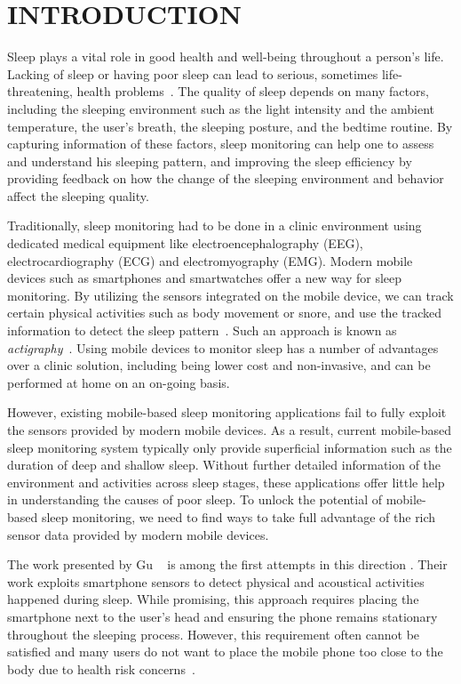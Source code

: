 \section{INTRODUCTION}\label{sec:1introduction}

Sleep plays a vital role in good health and well-being throughout a person's life. Lacking of sleep or having poor sleep can lead to
serious, sometimes life-threatening, health problems~\cite{lallukka2016contribution}. The quality of sleep depends on many factors,
including the sleeping environment such as the light intensity and the ambient temperature, the user's breath, the sleeping posture, and
the bedtime routine. By capturing information of these factors, sleep monitoring can help one to assess and understand his sleeping
pattern, and improving the sleep efficiency by providing feedback on how the change of the sleeping environment and behavior affect the
sleeping quality.

Traditionally, sleep monitoring had to be done in a clinic environment using dedicated medical equipment like electroencephalography (EEG),
electrocardiography (ECG) and electromyography (EMG).  Modern mobile devices such as smartphones and smartwatches offer a new way for sleep
monitoring. By utilizing the sensors integrated on the mobile device, we can track certain physical activities such as body movement or
snore, and use the tracked information to detect the sleep pattern~\cite{zeo,Jawbone,SleepAndroid,fitbit,gu2016sleep}. Such an approach is
known as \emph{actigraphy}~\cite{Actigraphy,ancoli2003role}. Using mobile devices to monitor sleep has a number of advantages over a clinic
solution, including being lower cost and non-invasive, and can be performed at home on an on-going basis.


However, existing mobile-based sleep monitoring applications fail to fully exploit the sensors provided by modern mobile devices. As a
result, current mobile-based sleep monitoring system typically only provide superficial information such as the duration of deep and
shallow sleep. Without further detailed information of the environment and activities across sleep stages, these applications offer little
help in understanding the causes of poor sleep. To unlock the potential of mobile-based sleep monitoring, we need to find ways to take full
advantage of the rich sensor data provided by modern mobile devices.


The work presented by Gu \etal~\cite{gu2016sleep} is among the first attempts in this direction
\cite{lawson2013validating,bauer2012shuteye,min2014toss,al2014classifying}. Their work exploits smartphone sensors to detect physical and
acoustical activities happened during sleep. While promising, this approach requires placing the smartphone next to the user's head and
ensuring the phone remains stationary throughout the sleeping process. However, this requirement often cannot be satisfied and many users
do not want to place the mobile phone too close to the body due to health risk concerns~\cite{StepHealth,Quorasleep}.

